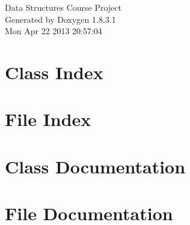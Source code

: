 \documentclass{book}
\begin{document}
\hypersetup{pageanchor=false,citecolor=blue}
\begin{titlepage}
\vspace*{7cm}
\begin{center}
{\Large Data Structures Course Project }\\
\vspace*{1cm}
{\large Generated by Doxygen 1.8.3.1}\\
\vspace*{0.5cm}
{\small Mon Apr 22 2013 20:57:04}\\
\end{center}
\end{titlepage}
\clearemptydoublepage
{}
\tableofcontents
\clearemptydoublepage
{}
\hypersetup{pageanchor=true,citecolor=blue}
\chapter{Class Index}

\chapter{File Index}

\chapter{Class Documentation}












\chapter{File Documentation}






\printindex
\end{document}
